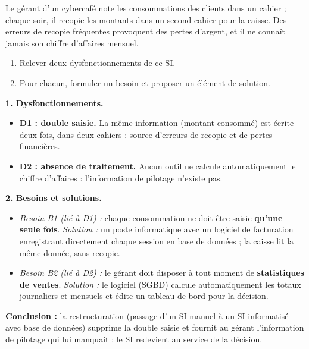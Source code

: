 \documentclass[11pt]{article}
\begin{document}
\begin{exoresolu}
Le gérant d'un cybercafé note les consommations des clients dans un cahier ; chaque soir, il recopie les montants dans un second cahier pour la caisse. Des erreurs de recopie fréquentes provoquent des pertes d'argent, et il ne connaît jamais son chiffre d'affaires mensuel.
\begin{enumerate}
  \item Relever deux dysfonctionnements de ce SI.
  \item Pour chacun, formuler un besoin et proposer un élément de solution.
\end{enumerate}
\tcblower
\textbf{1. Dysfonctionnements.}
\begin{itemize}
  \item \textbf{D1 : double saisie.} La même information (montant consommé) est écrite deux fois, dans deux cahiers : source d'erreurs de recopie et de pertes financières.
  \item \textbf{D2 : absence de traitement.} Aucun outil ne calcule automatiquement le chiffre d'affaires : l'information de pilotage n'existe pas.
\end{itemize}
\textbf{2. Besoins et solutions.}
\begin{itemize}
  \item \emph{Besoin B1 (lié à D1) :} chaque consommation ne doit être saisie \textbf{qu'une seule fois}. \emph{Solution :} un poste informatique avec un logiciel de facturation enregistrant directement chaque session en base de données ; la caisse lit la même donnée, sans recopie.
  \item \emph{Besoin B2 (lié à D2) :} le gérant doit disposer à tout moment de \textbf{statistiques de ventes}. \emph{Solution :} le logiciel (SGBD) calcule automatiquement les totaux journaliers et mensuels et édite un tableau de bord pour la décision.
\end{itemize}
\textbf{Conclusion :} la restructuration (passage d'un SI manuel à un SI informatisé avec base de données) supprime la double saisie et fournit au gérant l'information de pilotage qui lui manquait : le SI redevient au service de la décision.
\end{exoresolu}
\end{document}
